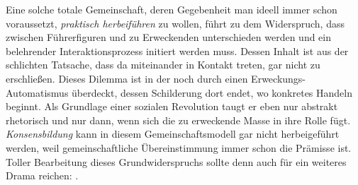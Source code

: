 Eine solche totale Gemeinschaft, deren Gegebenheit man ideell immer schon
voraussetzt, \emph{praktisch herbeiführen} zu wollen, führt zu dem Widerspruch,
dass zwischen Führerfiguren und zu Erweckenden unterschieden werden und ein
belehrender Interaktionsprozess initiert werden muss. Dessen Inhalt ist aus
der schlichten Tatsache, dass da \Cite{Menschen} miteinander in Kontakt
treten, gar nicht zu erschließen. Dieses Dilemma ist in der
 noch durch einen Erweckungs-Automatismus überdeckt, dessen
Schilderung dort endet, wo konkretes Handeln beginnt. Als Grundlage einer
sozialen Revolution taugt er eben nur abstrakt rhetorisch und nur
dann, wenn sich die zu erweckende Masse in ihre Rolle fügt.  
\emph{Konsensbildung} kann in diesem Gemeinschaftsmodell gar nicht
herbeigeführt werden, weil gemeinschaftliche Übereinstimmung immer schon
die Prämisse ist. Toller Bearbeitung dieses Grundwiderspruchs 
sollte denn auch für ein weiteres Drama reichen: .








